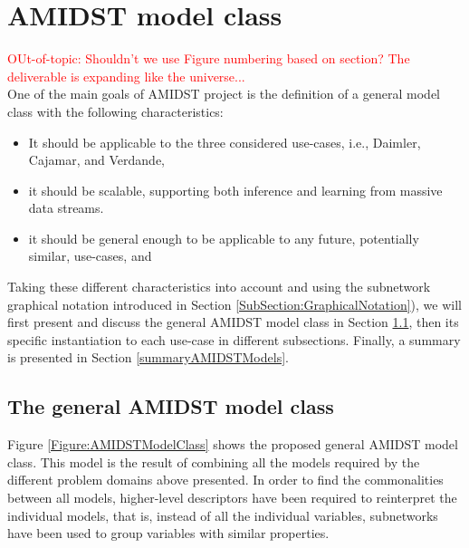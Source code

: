 \section{AMIDST model class}

\textcolor{red}{OUt-of-topic: Shouldn't we use Figure numbering based on section? The deliverable is expanding like the universe...}\\
One of the main goals of AMIDST project is the definition of a general model class with the following characteristics: 

\begin{itemize}
\item It should be applicable to the three considered use-cases, i.e., Daimler, Cajamar, and Verdande,

\item it should be scalable, supporting both inference and learning from massive data streams.

\item it should be general enough to be applicable to any future, potentially similar, use-cases, and

\end{itemize}

Taking these different characteristics into account and using the subnetwork graphical notation introduced in Section \ref{SubSection:GraphicalNotation}), we will first present and discuss the general AMIDST model class in Section \ref{GeneralModelClass}, then its specific instantiation to each use-case in different subsections. Finally, a summary is presented in Section \ref{summaryAMIDSTModels}.

\subsection{The general AMIDST model class}\label{GeneralModelClass}

Figure \ref{Figure:AMIDSTModelClass} shows the proposed general AMIDST model class. This model is the result of combining all the models required by the different problem domains above presented. In order to find the commonalities between all models, higher-level descriptors have been required to reinterpret the individual models, that is, instead of all the individual variables, subnetworks have been used to group variables with similar properties.


